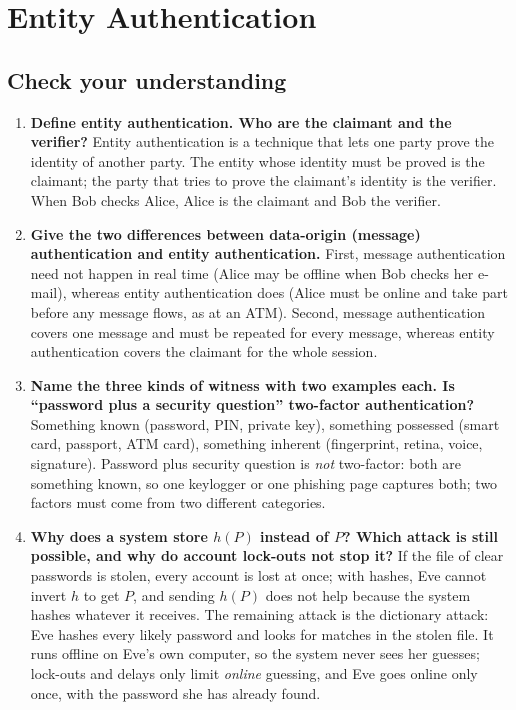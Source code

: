 \section{Entity Authentication}\label{q:entityauth}

\subsection*{Check your understanding}
\begin{enumerate}[leftmargin=1.6em,itemsep=3pt]
  \item \textbf{Define entity authentication. Who are the claimant and the verifier?} Entity authentication is a technique that lets one party prove the identity of another party. The entity whose identity must be proved is the claimant; the party that tries to prove the claimant's identity is the verifier. When Bob checks Alice, Alice is the claimant and Bob the verifier.
  \item \textbf{Give the two differences between data-origin (message) authentication and entity authentication.} First, message authentication need not happen in real time (Alice may be offline when Bob checks her e-mail), whereas entity authentication does (Alice must be online and take part before any message flows, as at an ATM). Second, message authentication covers one message and must be repeated for every message, whereas entity authentication covers the claimant for the whole session.
  \item \textbf{Name the three kinds of witness with two examples each. Is ``password plus a security question'' two-factor authentication?} Something known (password, PIN, private key), something possessed (smart card, passport, ATM card), something inherent (fingerprint, retina, voice, signature). Password plus security question is \emph{not} two-factor: both are something known, so one keylogger or one phishing page captures both; two factors must come from two different categories.
  \item \textbf{Why does a system store $h(P)$ instead of $P$? Which attack is still possible, and why do account lock-outs not stop it?} If the file of clear passwords is stolen, every account is lost at once; with hashes, Eve cannot invert $h$ to get $P$, and sending $h(P)$ does not help because the system hashes whatever it receives. The remaining attack is the dictionary attack: Eve hashes every likely password and looks for matches in the stolen file. It runs offline on Eve's own computer, so the system never sees her guesses; lock-outs and delays only limit \emph{online} guessing, and Eve goes online only once, with the password she has already found.

\end{enumerate}
